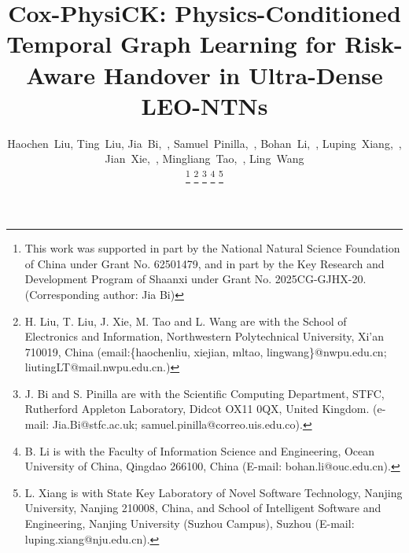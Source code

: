 \documentclass[10pt,letterpaper,journal]{IEEEtran}
\begin{document}

\title{Cox-PhysiCK: Physics-Conditioned Temporal Graph Learning for Risk-Aware Handover in Ultra-Dense LEO-NTNs}

\author{Haochen~Liu,
        Ting~Liu,
        Jia~Bi,~,
Samuel~Pinilla,~,
        Bohan~Li,~,
        Luping~Xiang,~,
        Jian~Xie,~,
        Mingliang~Tao,~,
        Ling~Wang
        
\thanks{This work was supported in part by the National Natural Science Foundation of China under Grant No. 62501479, and in part by the Key Research and Development Program of Shaanxi under Grant No. 2025CG-GJHX-20. (Corresponding author: Jia Bi)}
\thanks{H. Liu, T. Liu, J. Xie, M. Tao and L. Wang are with the School of Electronics and Information, Northwestern Polytechnical University, Xi'an 710019, China (email:\{haochenliu, xiejian, mltao, lingwang\}@nwpu.edu.cn; liutingLT@mail.nwpu.edu.cn.)}
\thanks{J. Bi and S. Pinilla are with the Scientific Computing Department, STFC, Rutherford Appleton Laboratory, Didcot OX11 0QX, United Kingdom. (e-mail: Jia.Bi@stfc.ac.uk; samuel.pinilla@correo.uis.edu.co).}
\thanks{B. Li is with the Faculty of Information Science and Engineering, Ocean University of China, Qingdao 266100, China (E-mail: bohan.li@ouc.edu.cn).}
\thanks{L. Xiang is with State Key Laboratory of Novel Software Technology, Nanjing University, Nanjing 210008, China, and School of Intelligent Software and Engineering, Nanjing University (Suzhou Campus), Suzhou (E-mail: luping.xiang@nju.edu.cn).}}
\end{document}
